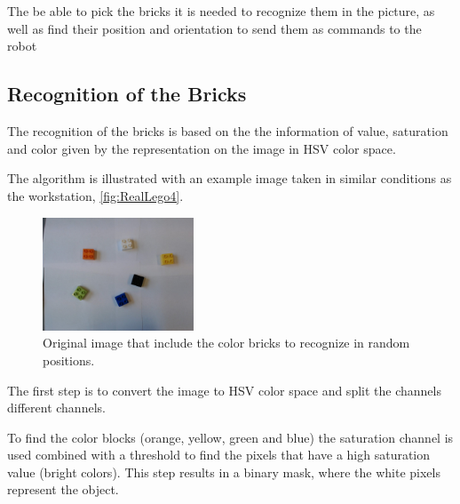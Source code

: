 \chapter{}\label{chap:bricks}
The be able to pick the bricks it is needed to recognize them in the picture, as well as find their position and orientation to send them as commands to the robot

\section{Recognition of the Bricks}
The recognition of the bricks is based on the the information of value, saturation and color given by the representation on the image in HSV color space.

The algorithm is illustrated with an example image taken in similar conditions as the workstation, \autoref{fig:RealLego4}.

\begin{figure}[H]
    \includegraphics[width=0.4\textwidth]{figures/RealLego4.jpg}
    \caption{Original image that include the color bricks to recognize in random positions.}
    \label{fig:RealLego4}
\end{figure}

The first step is to convert the image to HSV color space and split the channels different channels.

To find the color blocks (orange, yellow, green and blue) the saturation channel is used combined with a threshold to find the pixels that have a high saturation value (bright colors). This step results in a binary mask, where the white pixels represent the object.

